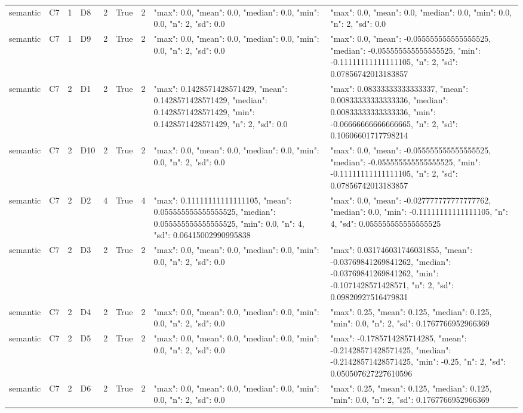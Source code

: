 \begin{tabular}{lllllllll}
semantic & C7 & 1 & D8 & 2 & True & 2 & {"max": 0.0, "mean": 0.0, "median": 0.0, "min": 0.0, "n": 2, "sd": 0.0} & {"max": 0.0, "mean": 0.0, "median": 0.0, "min": 0.0, "n": 2, "sd": 0.0} \\
semantic & C7 & 1 & D9 & 2 & True & 2 & {"max": 0.0, "mean": 0.0, "median": 0.0, "min": 0.0, "n": 2, "sd": 0.0} & {"max": 0.0, "mean": -0.055555555555555525, "median": -0.055555555555555525, "min": -0.11111111111111105, "n": 2, "sd": 0.07856742013183857} \\
semantic & C7 & 2 & D1 & 2 & True & 2 & {"max": 0.1428571428571429, "mean": 0.1428571428571429, "median": 0.1428571428571429, "min": 0.1428571428571429, "n": 2, "sd": 0.0} & {"max": 0.08333333333333337, "mean": 0.00833333333333336, "median": 0.00833333333333336, "min": -0.06666666666666665, "n": 2, "sd": 0.10606601717798214} \\
semantic & C7 & 2 & D10 & 2 & True & 2 & {"max": 0.0, "mean": 0.0, "median": 0.0, "min": 0.0, "n": 2, "sd": 0.0} & {"max": 0.0, "mean": -0.055555555555555525, "median": -0.055555555555555525, "min": -0.11111111111111105, "n": 2, "sd": 0.07856742013183857} \\
semantic & C7 & 2 & D2 & 4 & True & 4 & {"max": 0.11111111111111105, "mean": 0.055555555555555525, "median": 0.055555555555555525, "min": 0.0, "n": 4, "sd": 0.06415002990995838} & {"max": 0.0, "mean": -0.027777777777777762, "median": 0.0, "min": -0.11111111111111105, "n": 4, "sd": 0.055555555555555525} \\
semantic & C7 & 2 & D3 & 2 & True & 2 & {"max": 0.0, "mean": 0.0, "median": 0.0, "min": 0.0, "n": 2, "sd": 0.0} & {"max": 0.031746031746031855, "mean": -0.03769841269841262, "median": -0.03769841269841262, "min": -0.1071428571428571, "n": 2, "sd": 0.09820927516479831} \\
semantic & C7 & 2 & D4 & 2 & True & 2 & {"max": 0.0, "mean": 0.0, "median": 0.0, "min": 0.0, "n": 2, "sd": 0.0} & {"max": 0.25, "mean": 0.125, "median": 0.125, "min": 0.0, "n": 2, "sd": 0.1767766952966369} \\
semantic & C7 & 2 & D5 & 2 & True & 2 & {"max": 0.0, "mean": 0.0, "median": 0.0, "min": 0.0, "n": 2, "sd": 0.0} & {"max": -0.1785714285714285, "mean": -0.21428571428571425, "median": -0.21428571428571425, "min": -0.25, "n": 2, "sd": 0.050507627227610596} \\
semantic & C7 & 2 & D6 & 2 & True & 2 & {"max": 0.0, "mean": 0.0, "median": 0.0, "min": 0.0, "n": 2, "sd": 0.0} & {"max": 0.25, "mean": 0.125, "median": 0.125, "min": 0.0, "n": 2, "sd": 0.1767766952966369} \\

\end{tabular}
